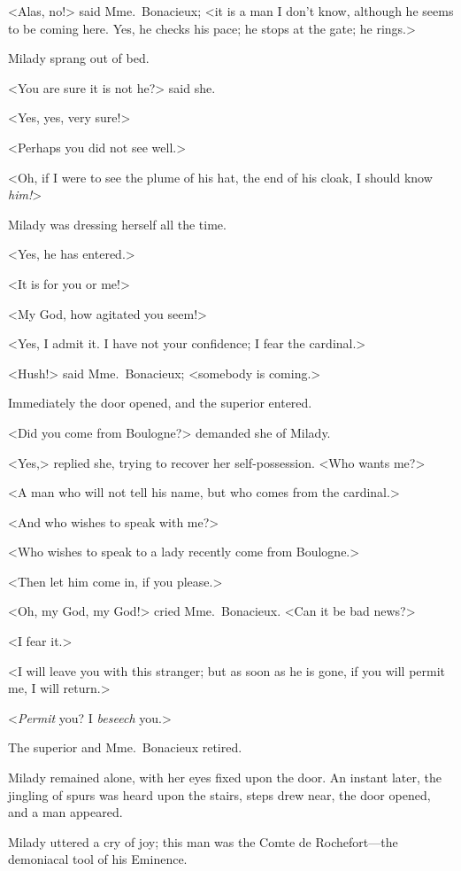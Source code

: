 <Alas, no!> said Mme.~Bonacieux; <it is a man I don't know, although he seems to be coming here. Yes, he checks his pace; he stops at the gate; he rings.> 

Milady sprang out of bed. 

<You are sure it is not he?> said she. 

<Yes, yes, very sure!> 

<Perhaps you did not see well.> 

<Oh, if I were to see the plume of his hat, the end of his cloak, I should know \emph{him!}> 

Milady was dressing herself all the time. 

<Yes, he has entered.> 

<It is for you or me!> 

<My God, how agitated you seem!> 

<Yes, I admit it. I have not your confidence; I fear the cardinal.> 

<Hush!> said Mme.~Bonacieux; <somebody is coming.> 

Immediately the door opened, and the superior entered. 

<Did you come from Boulogne?> demanded she of Milady. 

<Yes,> replied she, trying to recover her self-possession. <Who wants me?> 

<A man who will not tell his name, but who comes from the cardinal.> 

<And who wishes to speak with me?> 

<Who wishes to speak to a lady recently come from Boulogne.> 

<Then let him come in, if you please.> 

<Oh, my God, my God!> cried Mme.~Bonacieux. <Can it be bad news?> 

<I fear it.> 

<I will leave you with this stranger; but as soon as he is gone, if you will permit me, I will return.> 

<\emph{Permit} you? I \emph{beseech} you.> 

The superior and Mme.~Bonacieux retired. 

Milady remained alone, with her eyes fixed upon the door. An instant later, the jingling of spurs was heard upon the stairs, steps drew near, the door opened, and a man appeared. 

Milady uttered a cry of joy; this man was the Comte de Rochefort—the demoniacal tool of his Eminence. 